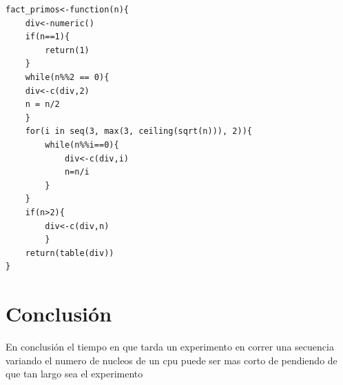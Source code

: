 \documentclass[a4paper]{article}
\begin{document}
 \begin{lstlisting}
fact_primos<-function(n){
    div<-numeric()
    if(n==1){
        return(1)
    }
    while(n%%2 == 0){
    div<-c(div,2)
    n = n/2
    }
    for(i in seq(3, max(3, ceiling(sqrt(n))), 2)){
        while(n%%i==0){
            div<-c(div,i)
            n=n/i
        }
    }
    if(n>2){
        div<-c(div,n)
        }
    return(table(div))
}
 \end{lstlisting}

\section{Conclusión}
\justify En conclusión el tiempo en que tarda un experimento en correr una secuencia variando el numero de nucleos de un cpu puede ser mas corto de pendiendo de que tan largo sea el experimento

\clearpage
\end{document}
